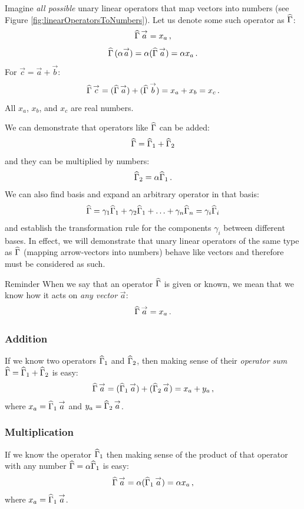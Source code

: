 Imagine \emph{all possible} unary linear
operators that map vectors into
numbers (see Figure \ref{fig:linearOperatorsToNumbers}). Let us denote
some such operator as $\widehat{\Gamma}$:
\[
\widehat{\Gamma}\,\overset{\rightarrow}{a}=x_a\,,
\]
\[
\widehat{\Gamma}\,(\alpha\overset{\rightarrow}{a})=\alpha(\widehat{\Gamma}\,\overset{\rightarrow}{a})=\alpha x_a\,.
\]
For $\vec{c}=\vec{a}+\vec{b}$:
\[
\widehat{\Gamma}\,\overset{\rightarrow}{c}=(\widehat{\Gamma}\,\overset{\rightarrow}{a})+(\widehat{\Gamma}\,\overset{\rightarrow}{b})=x_a+x_b=x_c\,.
\]
All $x_a$, $x_b$, and $x_c$ are real numbers.

We can demonstrate that operators like $\widehat{\Gamma}$ can be added:
\[
\widehat{\Gamma} = \widehat{\Gamma}_1 + \widehat{\Gamma}_2
\]
and they can be multiplied  by numbers:
\[
\widehat{\Gamma}_2 = \alpha\widehat{\Gamma}_1\,.
\]
We can also find basis and expand an arbitrary operator in that
basis:
\[
\widehat{\Gamma} = \gamma_1\widehat{\Gamma}_1 + \gamma_2\widehat{\Gamma}_1 + \ldots +
\gamma_n\widehat{\Gamma}_n = \gamma_i\widehat{\Gamma}_i
\]
 and establish the transformation rule for the
components $\gamma_i$ between different bases. In effect, we
will demonstrate that unary linear
operators of the same type as $\widehat{\Gamma}$ (mapping arrow-vectors
into numbers) behave like vectors and therefore must be considered as
such.

\begin{myrem}{Reminder}
When we say that an operator $\widehat{\Gamma}$ is given or known, we
mean that we know how it acts on \emph{any vector} $\vec{a}$:
\[
\widehat{\Gamma}\,\overset{\rightarrow}{a} = x_a\,.
\]
\end{myrem}

\subsubsection*{Addition}
If we know two operators $\widehat{\Gamma}_1$ and $\widehat{\Gamma}_2$, then
making sense of their \emph{operator sum}
$\widehat{\Gamma}=\widehat{\Gamma}_1 + \widehat{\Gamma}_2$ is easy:
\[
\widehat{\Gamma}\,\overset{\rightarrow}{a} =
(\widehat{\Gamma}_1\,\overset{\rightarrow}{a})+(\widehat{\Gamma}_2\,\overset{\rightarrow}{a})
= x_a + y_a\,,
\]
where $x_a = \widehat{\Gamma}_1\,\overset{\rightarrow}{a}$ and $y_a=\widehat{\Gamma}_2\,\overset{\rightarrow}{a}$.

\subsubsection*{Multiplication}
If we know the operator $\widehat{\Gamma}_1$ then
making sense of the product of that operator with any number
$\widehat{\Gamma}=\alpha\widehat{\Gamma}_1$ is easy:
\[
\widehat{\Gamma}\,\overset{\rightarrow}{a} = \alpha(\widehat{\Gamma}_1\,\overset{\rightarrow}{a}) = \alpha x_a\,,
\]
where $x_a = \widehat{\Gamma}_1\,\overset{\rightarrow}{a}$.

